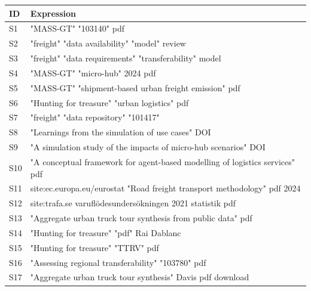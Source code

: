 \begin{longtable}{@{}p{.08\linewidth}p{.86\linewidth}@{}}

\toprule ID & Expression \\ \midrule\endhead

S1 & "MASS-GT" "103140" pdf \\[.4em]

S2 & "freight" "data availability" "model" review \\[.4em]

S3 & "freight" "data requirements" "transferability" model \\[.4em]

S4 & "MASS-GT" "micro-hub" 2024 pdf \\[.4em]

S5 & "MASS-GT" "shipment-based urban freight emission" pdf \\[.4em]

S6 & "Hunting for treasure" "urban logistics" pdf \\[.4em]

S7 & "freight" "data repository" "101417" \\[.4em]

S8 & "Learnings from the simulation of use cases" DOI \\[.4em]

S9 & "A simulation study of the impacts of micro-hub scenarios" DOI \\[.4em]

S10 & "A conceptual framework for agent-based modelling of logistics services" pdf \\[.4em]

S11 & site:ec.europa.eu/eurostat "Road freight transport methodology" pdf 2024 \\[.4em]

S12 & site:trafa.se varuflödesundersökningen 2021 statistik pdf \\[.4em]

S13 & "Aggregate urban truck tour synthesis from public data" pdf \\[.4em]

S14 & "Hunting for treasure" "pdf" Rai Dablanc \\[.4em]

S15 & "Hunting for treasure" "TTRV" pdf \\[.4em]

S16 & "Assessing regional transferability" "103780" pdf \\[.4em]

S17 & "Aggregate urban truck tour synthesis" Davis pdf download \\[.4em]


\end{longtable}
